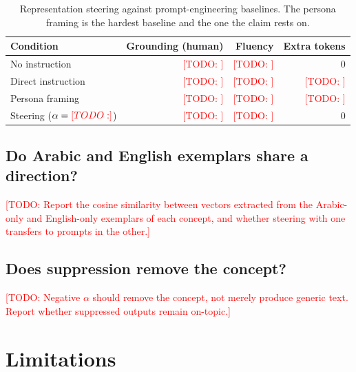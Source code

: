 \documentclass[11pt,a4paper]{article}
\newcommand{\todo}[1]{\textcolor{red}{[TODO: #1]}}
\begin{document}
\begin{table}[t]
  \centering
  \begin{tabular}{lrrr}
    \toprule
    Condition & Grounding (human) & Fluency & Extra tokens \\
    \midrule
    No instruction     & \todo{} & \todo{} & 0 \\
    Direct instruction & \todo{} & \todo{} & \todo{} \\
    Persona framing    & \todo{} & \todo{} & \todo{} \\
    Steering ($\alpha=\todo{}$) & \todo{} & \todo{} & 0 \\
    \bottomrule
  \end{tabular}
  \caption{Representation steering against prompt-engineering baselines. The
  persona framing is the hardest baseline and the one the claim rests on.}
  \label{tab:baselines}
\end{table}

\subsection{Do Arabic and English exemplars share a direction?}
\todo{Report the cosine similarity between vectors extracted from the Arabic-only
and English-only exemplars of each concept, and whether steering with one
transfers to prompts in the other.}

\subsection{Does suppression remove the concept?}
\todo{Negative $\alpha$ should remove the concept, not merely produce generic
text. Report whether suppressed outputs remain on-topic.}

\section{Limitations}
\label{sec:limitations}
\end{document}

